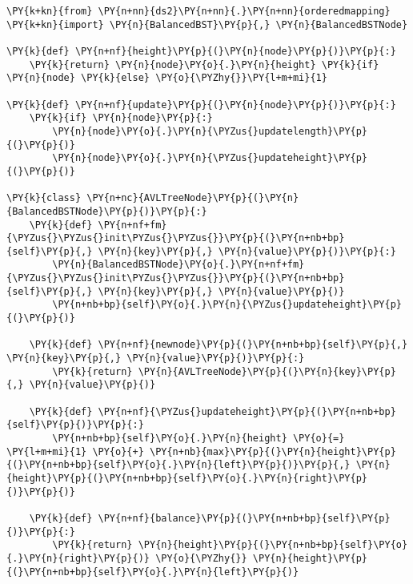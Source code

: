 \begin{Verbatim}[commandchars=\\\{\}]
\PY{k+kn}{from} \PY{n+nn}{ds2}\PY{n+nn}{.}\PY{n+nn}{orderedmapping} \PY{k+kn}{import} \PY{n}{BalancedBST}\PY{p}{,} \PY{n}{BalancedBSTNode}

\PY{k}{def} \PY{n+nf}{height}\PY{p}{(}\PY{n}{node}\PY{p}{)}\PY{p}{:}
    \PY{k}{return} \PY{n}{node}\PY{o}{.}\PY{n}{height} \PY{k}{if} \PY{n}{node} \PY{k}{else} \PY{o}{\PYZhy{}}\PY{l+m+mi}{1}

\PY{k}{def} \PY{n+nf}{update}\PY{p}{(}\PY{n}{node}\PY{p}{)}\PY{p}{:}
    \PY{k}{if} \PY{n}{node}\PY{p}{:}
        \PY{n}{node}\PY{o}{.}\PY{n}{\PYZus{}updatelength}\PY{p}{(}\PY{p}{)}
        \PY{n}{node}\PY{o}{.}\PY{n}{\PYZus{}updateheight}\PY{p}{(}\PY{p}{)}

\PY{k}{class} \PY{n+nc}{AVLTreeNode}\PY{p}{(}\PY{n}{BalancedBSTNode}\PY{p}{)}\PY{p}{:}
    \PY{k}{def} \PY{n+nf+fm}{\PYZus{}\PYZus{}init\PYZus{}\PYZus{}}\PY{p}{(}\PY{n+nb+bp}{self}\PY{p}{,} \PY{n}{key}\PY{p}{,} \PY{n}{value}\PY{p}{)}\PY{p}{:}
        \PY{n}{BalancedBSTNode}\PY{o}{.}\PY{n+nf+fm}{\PYZus{}\PYZus{}init\PYZus{}\PYZus{}}\PY{p}{(}\PY{n+nb+bp}{self}\PY{p}{,} \PY{n}{key}\PY{p}{,} \PY{n}{value}\PY{p}{)}
        \PY{n+nb+bp}{self}\PY{o}{.}\PY{n}{\PYZus{}updateheight}\PY{p}{(}\PY{p}{)}

    \PY{k}{def} \PY{n+nf}{newnode}\PY{p}{(}\PY{n+nb+bp}{self}\PY{p}{,} \PY{n}{key}\PY{p}{,} \PY{n}{value}\PY{p}{)}\PY{p}{:}
        \PY{k}{return} \PY{n}{AVLTreeNode}\PY{p}{(}\PY{n}{key}\PY{p}{,} \PY{n}{value}\PY{p}{)}

    \PY{k}{def} \PY{n+nf}{\PYZus{}updateheight}\PY{p}{(}\PY{n+nb+bp}{self}\PY{p}{)}\PY{p}{:}
        \PY{n+nb+bp}{self}\PY{o}{.}\PY{n}{height} \PY{o}{=} \PY{l+m+mi}{1} \PY{o}{+} \PY{n+nb}{max}\PY{p}{(}\PY{n}{height}\PY{p}{(}\PY{n+nb+bp}{self}\PY{o}{.}\PY{n}{left}\PY{p}{)}\PY{p}{,} \PY{n}{height}\PY{p}{(}\PY{n+nb+bp}{self}\PY{o}{.}\PY{n}{right}\PY{p}{)}\PY{p}{)}

    \PY{k}{def} \PY{n+nf}{balance}\PY{p}{(}\PY{n+nb+bp}{self}\PY{p}{)}\PY{p}{:}
        \PY{k}{return} \PY{n}{height}\PY{p}{(}\PY{n+nb+bp}{self}\PY{o}{.}\PY{n}{right}\PY{p}{)} \PY{o}{\PYZhy{}} \PY{n}{height}\PY{p}{(}\PY{n+nb+bp}{self}\PY{o}{.}\PY{n}{left}\PY{p}{)}


\end{Verbatim}
